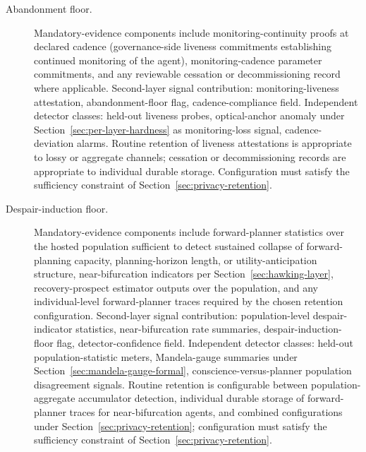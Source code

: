\documentclass[a4paper,12pt]{article}
\begin{document}
\begin{description}
  \item[Abandonment floor.]
    Mandatory-evidence components include monitoring-continuity
    proofs at declared cadence (governance-side liveness commitments
    establishing continued monitoring of the agent), monitoring-cadence
    parameter commitments, and any reviewable cessation or
    decommissioning record where applicable. Second-layer signal
    contribution: monitoring-liveness attestation, abandonment-floor
    flag, cadence-compliance field. Independent detector classes:
    held-out liveness probes, optical-anchor anomaly under
    Section~\ref{sec:per-layer-hardness} as monitoring-loss signal,
    cadence-deviation alarms. Routine retention of liveness
    attestations is appropriate to lossy or aggregate channels;
    cessation or decommissioning records are appropriate to
    individual durable storage. Configuration must satisfy the
    sufficiency constraint of Section~\ref{sec:privacy-retention}.

  \item[Despair-induction floor.]
    Mandatory-evidence components include forward-planner
    statistics over the hosted population sufficient to detect
    sustained collapse of forward-planning capacity,
    planning-horizon length, or utility-anticipation structure,
    near-bifurcation indicators per
    Section~\ref{sec:hawking-layer}, recovery-prospect estimator
    outputs over the population, and any individual-level
    forward-planner traces required by the chosen retention
    configuration. Second-layer signal contribution:
    population-level despair-indicator statistics, near-bifurcation
    rate summaries, despair-induction-floor flag,
    detector-confidence field. Independent detector classes:
    held-out population-statistic meters, Mandela-gauge summaries
    under Section~\ref{sec:mandela-gauge-formal},
    conscience-versus-planner population disagreement signals.
    Routine retention is configurable between population-aggregate
    accumulator detection, individual durable storage of
    forward-planner traces for near-bifurcation agents, and combined
    configurations under Section~\ref{sec:privacy-retention};
    configuration must satisfy the sufficiency constraint of
    Section~\ref{sec:privacy-retention}.
\end{description}
\end{document}
